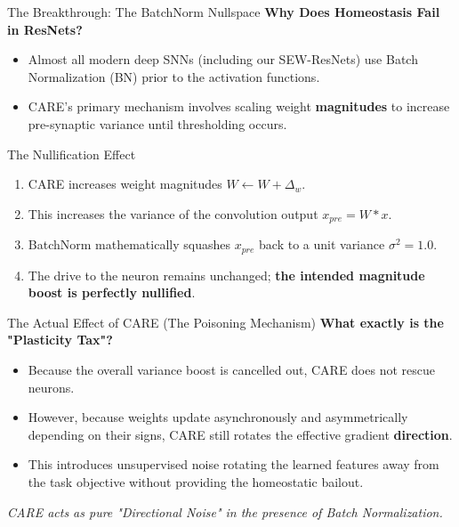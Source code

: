 \documentclass[aspectratio=169]{beamer}
\begin{document}
\begin{frame}{The Breakthrough: The BatchNorm Nullspace}
    \textbf{Why Does Homeostasis Fail in ResNets?}
    \begin{itemize}
        \item Almost all modern deep SNNs (including our SEW-ResNets) use Batch Normalization (BN) prior to the activation functions.
        \item CARE's primary mechanism involves scaling weight \textbf{magnitudes} to increase pre-synaptic variance until thresholding occurs.
    \end{itemize}
    
    \vspace{0.3cm}
    \begin{block}{The Nullification Effect}
        \begin{enumerate}
            \item CARE increases weight magnitudes $W \leftarrow W + \Delta_w$.
            \item This increases the variance of the convolution output $x_{pre} = W * x$.
            \item BatchNorm mathematically squashes $x_{pre}$ back to a unit variance $\sigma^2 = 1.0$.
            \item The drive to the neuron remains unchanged; \textbf{the intended magnitude boost is perfectly nullified}.
        \end{enumerate}
    \end{block}
\end{frame}

\begin{frame}{The Actual Effect of CARE (The Poisoning Mechanism)}
    \textbf{What exactly is the "Plasticity Tax"?}
    \begin{itemize}
        \item Because the overall variance boost is cancelled out, CARE does not rescue neurons.
        \item However, because weights update asynchronously and asymmetrically depending on their signs, CARE still rotates the effective gradient \textbf{direction}.
        \item This introduces unsupervised noise rotating the learned features away from the task objective without providing the homeostatic bailout.
    \end{itemize}
    
    \vspace{0.3cm}
    \centering
    \textit{CARE acts as pure "Directional Noise" in the presence of Batch Normalization.}
\end{frame}
\end{document}
